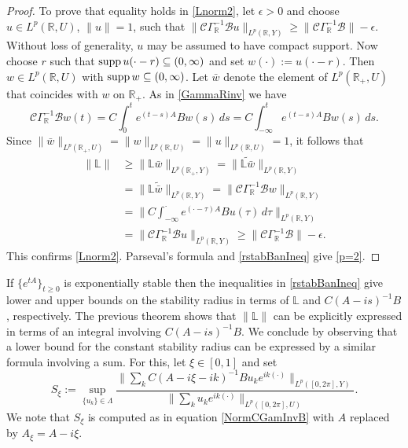 \documentclass[10pt,psamsfonts,leqno]{siamltex}
\newcommand{\bbR}{\mathbb{R}}
\newcommand{\bbL}{\mathbb{L}}
\newcommand{\calB}{\mathcal{B}}
\newcommand{\calC}{\mathcal{C}}
\newcommand{\LpRU}{{L^p(\bbR_+,U)}}
\newcommand{\LpRY}{{L^p(\bbR_+,Y)}}
\begin{document}
\begin{proof}
To prove that equality holds in \eqref{Lnorm2}, let $\epsilon>0$
and choose $u\in L^p(\bbR,U)$, $\| u\| =1$, such that
$\|\calC \Gamma_\bbR ^{-1} \calB u \|_{L^p(\bbR,Y)}\ge
 \|\calC  \Gamma_\bbR^{-1}\calB \| -\epsilon$.
Without loss of generality, $u$ may be assumed to have compact support.
Now choose $r$ such that $\supp u(\cdot -r)\subseteq (0,\infty)$ and set
$w(\cdot):= u(\cdot -r)$.  Then $w\in L^p(\bbR,U)$ with $\supp
w\subseteq
(0,\infty)$.  Let $\bar{w}$ denote the element of $\LpRU$ that coincides
with $w$ on $\bbR_+$.  As in \eqref{GammaRinv} we have
\begin{equation*}
\calC \Gamma_\bbR ^{-1} \calB w(t)= C\int_0^t e^{(t-s)A} B w(s)\, ds= C
\int_{-\infty}^t e^{(t-s)A} B w(s)\, ds.
\end{equation*}
Since $\| \bar{w} \|_\LpRU = \| w \|_{L^p(\bbR,U)}=  \| u
\|_{L^p(\bbR,U)} =1$,  it follows that
\begin{align*}
\| \bbL \| &\ge \| \bbL \bar{w}  \| _\LpRY = \| \widetilde{\bbL \bar{w}}
\|_{L^p(\bbR,Y)}\\
&=\| \bbL \tilde{\bar{w}} \|_{L^p(\bbR,Y)}=
\| \calC \Gamma_\bbR ^{-1} \calB w\|_{L^p(\bbR,Y)}\\
&=\| C \int_{-\infty}^\cdot e^{(\cdot-\tau)A} B u(\tau)\, d\tau \|
_{L^p(\bbR,Y)}\\
&=\| \calC \Gamma_\bbR ^{-1} \calB u \|_{L^p(\bbR,Y)}
\ge \| \calC \Gamma_\bbR ^{-1} \calB\| - \epsilon.
\end{align*}
This confirms \eqref{Lnorm2}. Parseval's formula and
\eqref{rstabBanIneq} give \eqref{p=2}.
\end{proof}


If $\{e^{tA}\}_{t\ge0}$ is exponentially stable
then the inequalities in \eqref{rstabBanIneq} give lower and upper
bounds on the stability radius in terms of $\bbL$ and $C(A-is)^{-1}B$,
respectively.  The previous theorem shows that $\|\bbL\|$ can be
explicitly expressed in terms of an integral involving $C(A-is)^{-1}B$.
We
conclude by observing that a lower bound for the constant stability
radius can be expressed by a similar formula involving a sum.
 For this, let $\xi\in[0,1]$ and
set
\[
S_\xi:=\sup_{\{u_k\}\in\Lambda}
     \frac{\|\sum_k
C(A-i\xi-ik)^{-1}Bu_ke^{ik(\cdot)}\|_{L^p([0,2\pi],Y)}}
     {\|\sum_k u_ke^{ik(\cdot)}\|_{L^p([0,2\pi],U)}}.
\]
We note that $S_\xi$ is computed as in equation \eqref{NormCGamInvB}
with $A$ replaced by $A_\xi=A-i\xi$.
\end{document}
